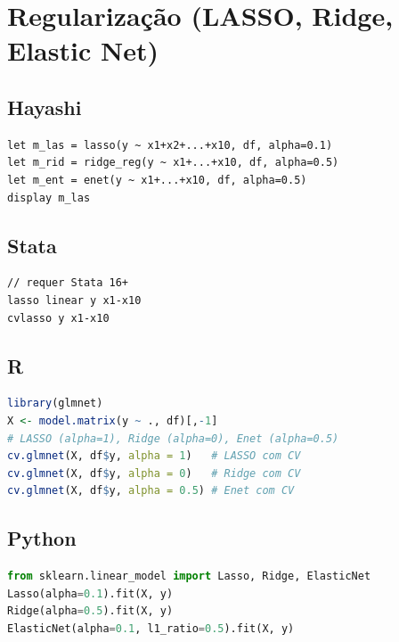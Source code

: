 \section{Regularização (LASSO, Ridge, Elastic Net)}

\subsection*{Hayashi}

\begin{lstlisting}
let m_las = lasso(y ~ x1+x2+...+x10, df, alpha=0.1)
let m_rid = ridge_reg(y ~ x1+...+x10, df, alpha=0.5)
let m_ent = enet(y ~ x1+...+x10, df, alpha=0.5)
display m_las
\end{lstlisting}

\subsection*{Stata}

\begin{lstlisting}[language={}, basicstyle=\ttfamily\small,
  frame=single, numbers=none, backgroundcolor=\color{codbg}]
// requer Stata 16+
lasso linear y x1-x10
cvlasso y x1-x10
\end{lstlisting}

\subsection*{R}

\begin{lstlisting}[language=R, basicstyle=\ttfamily\small,
  frame=single, numbers=none, backgroundcolor=\color{codbg},
  keywordstyle=\color{keyword}\bfseries,
  stringstyle=\color{string},
  commentstyle=\color{comment}\itshape]
library(glmnet)
X <- model.matrix(y ~ ., df)[,-1]
# LASSO (alpha=1), Ridge (alpha=0), Enet (alpha=0.5)
cv.glmnet(X, df$y, alpha = 1)   # LASSO com CV
cv.glmnet(X, df$y, alpha = 0)   # Ridge com CV
cv.glmnet(X, df$y, alpha = 0.5) # Enet com CV
\end{lstlisting}

\subsection*{Python}

\begin{lstlisting}[language=Python, basicstyle=\ttfamily\small,
  frame=single, numbers=none, backgroundcolor=\color{codbg},
  keywordstyle=\color{keyword}\bfseries,
  stringstyle=\color{string},
  commentstyle=\color{comment}\itshape]
from sklearn.linear_model import Lasso, Ridge, ElasticNet
Lasso(alpha=0.1).fit(X, y)
Ridge(alpha=0.5).fit(X, y)
ElasticNet(alpha=0.1, l1_ratio=0.5).fit(X, y)
\end{lstlisting}

